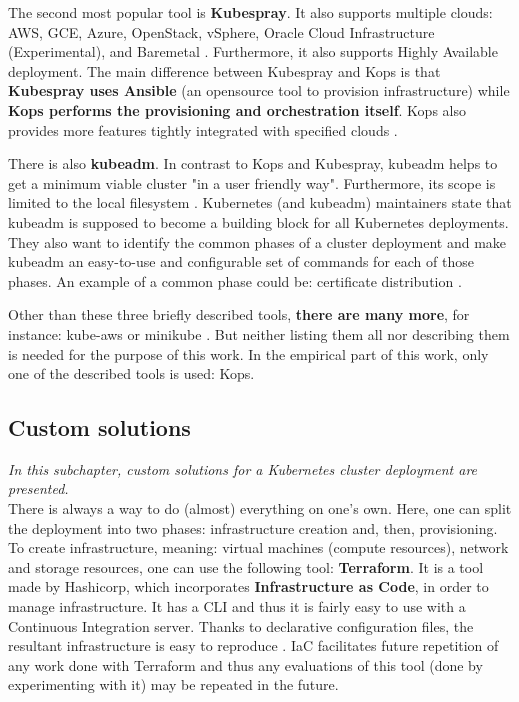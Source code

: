 The second most popular tool is \textbf{Kubespray}. It also supports multiple clouds: AWS, GCE, Azure, OpenStack, vSphere, Oracle Cloud Infrastructure (Experimental), and Baremetal \cite{online-ks}. Furthermore, it also supports Highly Available deployment. The main difference between Kubespray and Kops is that \textbf{Kubespray uses Ansible} (an opensource tool to provision infrastructure) while \textbf{Kops performs the provisioning and orchestration itself}. Kops also provides more features tightly integrated with specified clouds \cite{online-ks-comp}.

There is also \textbf{kubeadm}. In contrast to Kops and Kubespray, kubeadm helps to get a minimum viable cluster "in a user friendly way". Furthermore, its scope is limited to the local filesystem \cite{online-kubeadm}. Kubernetes (and kubeadm) maintainers state that kubeadm is supposed to become a building block for all Kubernetes deployments. They also want to identify the common phases of a cluster deployment and make kubeadm an easy-to-use and configurable set of commands for each of those phases. An example of a common phase could be: certificate distribution \cite{kubeadm-vision-2017}.

Other than these three briefly described tools, \textbf{there are many more}, for instance: kube-aws \cite{kube-aws} or minikube \cite{minikube}. But neither listing them all nor describing them is needed for the purpose of this work. In the empirical part of this work, only one of the described tools is used: Kops.

\subsection{Custom solutions}
\textit{In this subchapter, custom solutions for a Kubernetes cluster deployment are presented.}
\\

There is always a way to do (almost) everything on one's own. Here, one can split the deployment into two phases: infrastructure creation and, then, provisioning. To create infrastructure, meaning: virtual machines (compute resources), network and storage resources, one can use the following tool: \textbf{Terraform}. It is a tool made by Hashicorp, which incorporates \textbf{Infrastructure as Code}, in order to manage infrastructure. It has a CLI and thus it is fairly easy to use with a Continuous Integration server. Thanks to declarative configuration files, the resultant infrastructure is easy to reproduce \cite{terraform}. IaC facilitates future repetition of any work done with Terraform and thus any evaluations of this tool (done by experimenting with it) may be repeated in the future.


